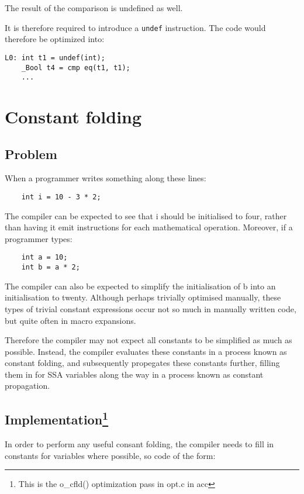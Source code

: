 \documentclass[12pt, a4paper]{article}
\begin{document}
The result of the comparison is undefined as well.

It is therefore required to introduce a \verb+undef+ instruction. The code would 
therefore be
optimized into:

\begin{lstlisting}
L0:	int t1 = undef(int);
	_Bool t4 = cmp eq(t1, t1);
	...
\end{lstlisting}


\section{Constant folding}
\subsection{Problem}
When a programmer writes something along these lines:

\begin{lstlisting}
	int i = 10 - 3 * 2;
\end{lstlisting}

The compiler can be expected to see that i should be initialised to four, rather 
than having it emit instructions for each mathematical operation. Moreover, if a 
programmer types:

\begin{lstlisting}
	int a = 10;
	int b = a * 2;
\end{lstlisting}

The compiler can also be expected to simplify the initialisation of b into an 
initialisation to twenty. Although perhaps trivially optimised manually, these
types of trivial constant expressions occur not so much in manually written code,
but quite often in macro expansions.

Therefore the compiler may not expect all constants to be simplified as much as
possible. Instead, the compiler evaluates these constants in a process known as 
constant folding, and subsequently propegates these constants further, filling 
them in for SSA variables along the way in a process known as constant 
propagation.

\subsection[Implementation] {Implementation\footnote{This is the o\_cfld() optimization pass in opt.c in acc} }
In order to perform any useful consant folding, the compiler needs to fill in 
constants for variables where possible, so code of the form:
\end{document}
